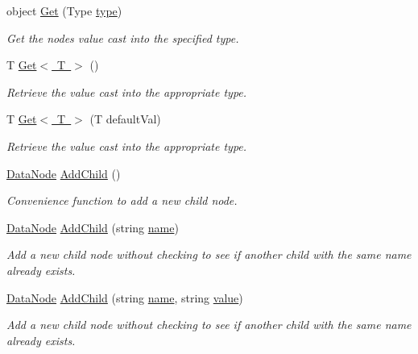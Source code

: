\begin{DoxyCompactItemize}
object \mbox{\hyperlink{class_t_net_1_1_data_node_a8118d9feb33d0db66367d8dd9629ae6f}{Get}} (Type \mbox{\hyperlink{class_t_net_1_1_data_node_a7a6d9db4eb81d226651ef3573655d975}{type}})
\begin{DoxyCompactList}\small\item\em Get the node\textquotesingle{}s value cast into the specified type. \end{DoxyCompactList}\item 
T \mbox{\hyperlink{class_t_net_1_1_data_node_a5255fbb293b4743c2cd4410f8d288353}{Get$<$ T $>$}} ()
\begin{DoxyCompactList}\small\item\em Retrieve the value cast into the appropriate type. \end{DoxyCompactList}\item 
T \mbox{\hyperlink{class_t_net_1_1_data_node_a82f3c118d970fd1e2b0b7a9f50d776c9}{Get$<$ T $>$}} (T default\+Val)
\begin{DoxyCompactList}\small\item\em Retrieve the value cast into the appropriate type. \end{DoxyCompactList}\item 
\mbox{\hyperlink{class_t_net_1_1_data_node}{Data\+Node}} \mbox{\hyperlink{class_t_net_1_1_data_node_a379707c85e05f5019e726547ee666e3a}{Add\+Child}} ()
\begin{DoxyCompactList}\small\item\em Convenience function to add a new child node. \end{DoxyCompactList}\item 
\mbox{\hyperlink{class_t_net_1_1_data_node}{Data\+Node}} \mbox{\hyperlink{class_t_net_1_1_data_node_aad50f0be4fc418656afa91b2cbcd713d}{Add\+Child}} (string \mbox{\hyperlink{class_t_net_1_1_data_node_aaf44a44fb25aad98dd115faf7607858c}{name}})
\begin{DoxyCompactList}\small\item\em Add a new child node without checking to see if another child with the same name already exists. \end{DoxyCompactList}\item 
\mbox{\hyperlink{class_t_net_1_1_data_node}{Data\+Node}} \mbox{\hyperlink{class_t_net_1_1_data_node_a5b319a56a06eb157048a66a62b5b6787}{Add\+Child}} (string \mbox{\hyperlink{class_t_net_1_1_data_node_aaf44a44fb25aad98dd115faf7607858c}{name}}, string \mbox{\hyperlink{class_t_net_1_1_data_node_ab1b718ef512ce7e5ebff5aa1a6c8e37b}{value}})
\begin{DoxyCompactList}\small\item\em Add a new child node without checking to see if another child with the same name already exists. \end{DoxyCompactList}\item 

\end{DoxyCompactItemize}
